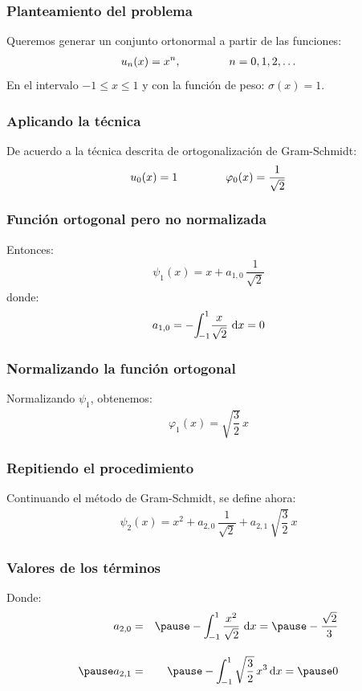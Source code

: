 \documentclass[12pt]{beamer}
\begin{document}
\begin{frame}
\frametitle{Planteamiento del problema}
Queremos generar un conjunto ortonormal a partir de las funciones:
\pause
\begin{align*}
u_{n} (x) = x^{n}, \hspace{1.5cm} n = 0, 1, 2, \ldots
\end{align*}
En el intervalo $-1 \leq x \leq 1$ y con la función de peso: $\sigma (x) = 1$.
\end{frame}
\begin{frame}
\frametitle{Aplicando la técnica}
De acuerdo a la técnica descrita de ortogonalización de Gram-Schmidt:
\pause
\begin{align}
u_{0} (x) = 1 \hspace{1.5cm} \varphi_{0} (x) =  \dfrac{1}{\sqrt{2}}
\label{eq:ecuacion_10_50}
\end{align}
\end{frame}
\begin{frame}
\frametitle{Función ortogonal pero no normalizada}
Entonces:
\pause
\begin{align}
\psi_{1} (x) = x + a_{1,0} \, \dfrac{1}{\sqrt{2}}
\label{eq:ecuacion_10_51}
\end{align}
\pause
donde:
\begin{align}
a_{1, 0} = - \scaleint{5ex}_{\bs -1}^{1} \dfrac{x}{\sqrt{2}} \, \dd{x} = 0
\label{eq:ecuacion_10_52}
\end{align}
\end{frame}
\begin{frame}
\frametitle{Normalizando la función ortogonal}
Normalizando $\psi_{1}$, obtenemos:
\pause
\begin{align}
\varphi_{1} (x) = \sqrt{\dfrac{3}{2}} \, x
\label{eq:ecuacion_10_53}
\end{align}
\end{frame}
\begin{frame}
\frametitle{Repitiendo el procedimiento}
Continuando el método de Gram-Schmidt, se define ahora:
\pause
\begin{align}
\psi_{2} (x) = x^{2} +  a_{2, 0} \, \dfrac{1}{\sqrt{2}} +  a_{2, 1} \, \sqrt{\dfrac{3}{2}} \, x
\label{eq:ecuacion_10_54}
\end{align}
\end{frame}
\begin{frame}
\frametitle{Valores de los términos}
Donde:
\pause
\begin{eqnarray}
a_{2, 0} &=& \pause - \scaleint{5ex}_{\bs -1}^{1} \, \dfrac{x^{2}}{\sqrt{2}} \, \dd{x} = \pause - \dfrac{\sqrt{2}}{3} \label{eq:ecuacion_10_55} \\[1em] \pause
a_{2, 1} &=& \pause - \scaleint{5ex}_{\bs -1}^{1} \, \sqrt{\dfrac{3}{2}} \, x^{3} \dd{x} = \pause 0 \label{eq:ecuacion_10_56}
\end{eqnarray}
\end{frame}
\end{document}
